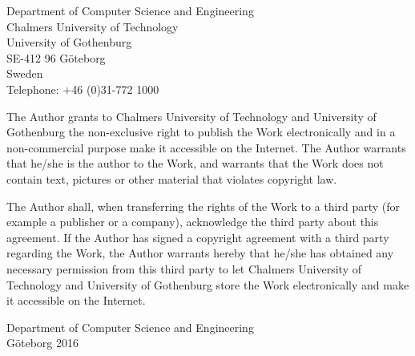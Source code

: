 \noindent
Department of Computer Science and Engineering\\
Chalmers University of Technology\\
University of Gothenburg\\
SE-412 96  Göteborg\\
Sweden\\
Telephone: +46 (0)31-772 1000\\
\setlength{\parskip}{0.5cm}

\vfill

\noindent
The Author grants to Chalmers University of Technology and University of Gothenburg the non-exclusive right to publish the Work electronically and in a non-commercial purpose make it accessible on the Internet.
The Author warrants that he/she is the author to the Work, and warrants that the Work does not contain text, pictures or other material that violates copyright law.

\noindent
The Author shall, when transferring the rights of the Work to a third party (for example a publisher or a company), acknowledge the third party about this agreement. If the Author has signed a copyright agreement with a third party regarding the Work, the Author warrants hereby that he/she has obtained any necessary permission from this third party to let Chalmers University of Technology and University of Gothenburg  store the Work electronically and make it accessible on the Internet.

\noindent
Department of Computer Science and Engineering\\
Göteborg 2016




